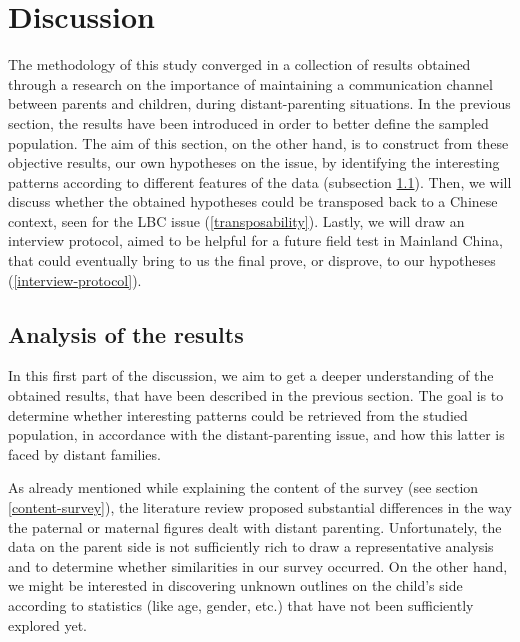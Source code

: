 \section{Discussion}
\label{sec:discussion}

The methodology of this study converged in a collection of results obtained through a research on the importance of maintaining a communication channel between parents and children, during distant-parenting situations. In the previous section, the results have been introduced in order to better define the sampled population. The aim of this section, on the other hand, is to construct from these objective results, our own hypotheses on the issue, by identifying the interesting patterns according to different features of the data (subsection \ref{subsec:analysis-results}). Then, we will discuss whether the obtained hypotheses could be transposed back to a Chinese context, seen for the LBC issue (\ref{transposability}). Lastly, we will draw an interview protocol, aimed to be helpful for a future field test in Mainland China, that could eventually bring to us the final prove, or disprove, to our hypotheses (\ref{interview-protocol}).

\subsection{Analysis of the results}
\label{subsec:analysis-results}

In this first part of the discussion, we aim to get a deeper understanding of the obtained results, that have been described in the previous section. The goal is to determine whether interesting patterns could be retrieved from the studied population, in accordance with the distant-parenting issue, and how this latter is faced by distant families.

As already mentioned while explaining the content of the survey (see section \ref{content-survey}), the literature review proposed substantial differences in the way the paternal or maternal figures dealt with distant parenting. Unfortunately, the data on the parent side is not sufficiently rich to draw a representative analysis and to determine whether similarities in our survey occurred. On the other hand, we might be interested in discovering unknown outlines on the child's side according to statistics (like age, gender, etc.) that have not been sufficiently explored yet.

